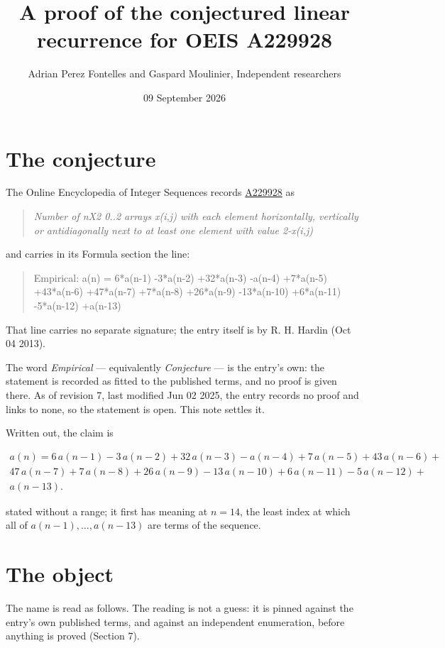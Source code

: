 \documentclass[11pt]{article}
\title{A proof of the conjectured linear recurrence for OEIS A229928}
\author{Adrian Perez Fontelles and Gaspard Moulinier, Independent researchers}
\date{09 September 2026}
\theoremstyle{definition}
\begin{document}
\maketitle
\section{The conjecture}

The Online Encyclopedia of Integer Sequences records \href{https://oeis.org/A229928}{A229928} as

\begin{quote}\itshape Number of nX2 0..2 arrays x(i,j) with each element horizontally, vertically or antidiagonally next to at least one element with value 2-x(i,j)\end{quote}

and carries in its Formula section the line:

\begin{quote}\ttfamily Empirical: a(n) = 6*a(n-1) -3*a(n-2) +32*a(n-3) -a(n-4) +7*a(n-5) +43*a(n-6) +47*a(n-7) +7*a(n-8) +26*a(n-9) -13*a(n-10) +6*a(n-11) -5*a(n-12) +a(n-13)\end{quote}

That line carries no separate signature; the entry itself is by R. H. Hardin (Oct 04 2013).

The word {\itshape Empirical} --- equivalently {\itshape Conjecture} --- is the entry's own: the statement is recorded as fitted to the published terms, and no proof is given there. As of revision 7, last modified Jun 02 2025, the entry records no proof and links to none, so the statement is open. This note settles it.

Written out, the claim is

\begin{multline*} a(n) = 6\,a(n-1) - 3\,a(n-2) + 32\,a(n-3) - a(n-4) + 7\,a(n-5) + 43\,a(n-6) + \\ 47\,a(n-7) + 7\,a(n-8) + 26\,a(n-9) - 13\,a(n-10) + 6\,a(n-11) - 5\,a(n-12) + \\ a(n-13). \end{multline*}

stated without a range; it first has meaning at $n = 14$, the least index at which all of $a(n-1),\dots,a(n-13)$ are terms of the sequence.

\section{The object}

The name is read as follows. The reading is not a guess: it is pinned against the entry's own published terms, and against an independent enumeration, before anything is proved (Section 7).
\end{document}

